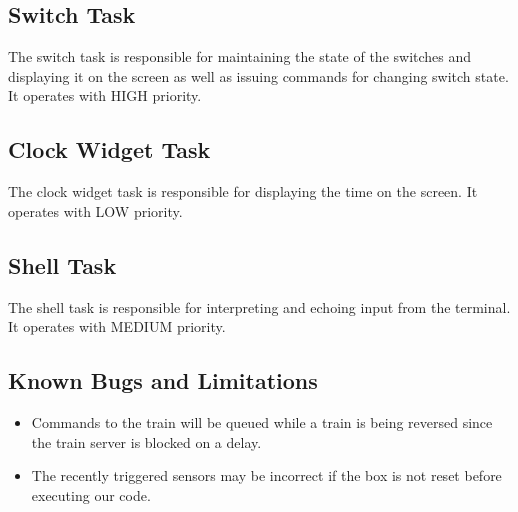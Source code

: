 \documentclass{article}
\begin{document}
\subsection{Switch Task}
The switch task is responsible for maintaining the state of the switches and displaying it on the screen as well as issuing commands for changing switch state. It operates with HIGH priority.

\subsection{Clock Widget Task}
The clock widget task is responsible for displaying the time on the screen. It operates with LOW priority.

\subsection{Shell Task}
The shell task is responsible for interpreting and echoing input from the terminal. It operates with MEDIUM priority.

\subsection{Known Bugs and Limitations}
\begin{itemize}
\item Commands to the train will be queued while a train is being reversed since the train server is blocked on a delay.
\item The recently triggered sensors may be incorrect if the box is not reset before executing our code.
\end{itemize}
\end{document}
